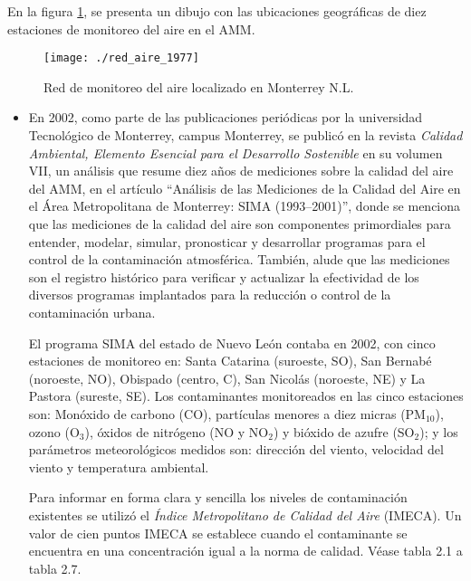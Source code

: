 En la figura \ref{red_1977}, se presenta un dibujo con las ubicaciones geográficas de diez estaciones de monitoreo del aire en el AMM.

\begin{figure}[H]
\centering
\texttt{[image: ./red\_aire\_1977]}
\caption{Red de monitoreo del aire localizado en Monterrey N.L.}
\label{red_1977}
\end{figure}

\begin{itemize}
\item En 2002, como parte de las publicaciones periódicas por la universidad Tecnológico de Monterrey, campus Monterrey, se publicó en la revista \textit{Calidad Ambiental, Elemento Esencial para el Desarrollo Sostenible} en su volumen VII, un análisis que resume diez años de mediciones sobre la calidad del aire del AMM, en el artículo ``Análisis de las Mediciones de la Calidad del Aire en el Área Metropolitana de Monterrey: SIMA (1993--2001)'', donde se menciona que las mediciones de la calidad del aire son componentes primordiales para entender, modelar, simular, pronosticar y desarrollar programas para el control de la contaminación atmosférica. También, alude que las mediciones son el registro histórico para verificar y actualizar la efectividad de los diversos programas implantados para la reducción o control de la contaminación urbana.

El programa SIMA del estado de Nuevo León contaba en 2002, con cinco estaciones de monitoreo en: Santa Catarina (suroeste, SO), San Bernabé (noroeste, NO), Obispado (centro, C), San Nicolás (noroeste, NE) y La Pastora (sureste, SE). Los contaminantes monitoreados en las cinco estaciones son: Monóxido de carbono (CO), partículas menores a diez micras (PM$_{10}$), ozono (O$_{3}$), óxidos de nitrógeno (NO y NO$_{2}$) y bióxido de azufre (SO$_{2}$); y los parámetros meteorológicos medidos son: dirección del viento, velocidad del viento y temperatura ambiental.

Para informar en forma clara y sencilla los niveles de contaminación existentes se utilizó el \textit{Índice Metropolitano de Calidad del Aire} (IMECA). Un valor de cien puntos IMECA se establece cuando el contaminante se encuentra en una concentración igual a la norma de calidad. Véase tabla 2.1 a tabla 2.7.
\end{itemize}

